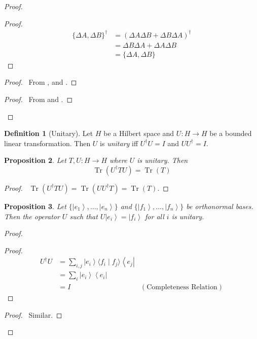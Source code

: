 \documentclass{book}
\let\qed\relax
\newtheorem{prop}{Proposition}[chapter]
\theoremstyle{definition}
\newtheorem{df}[prop]{Definition}
\newcommand{\bra}[1]{\ensuremath{\left\langle {#1} \right|}}
\newcommand{\ket}[1]{\ensuremath{\left| {#1} \right\rangle}}
\newcommand{\Tr}{\ensuremath{\operatorname{Tr}}}
\begin{document}
\begin{proof}
\begin{proof}
	\pf
	\begin{align*}
		\{ \Delta A, \Delta B \}^\dagger
		& = (\Delta A \Delta B + \Delta B \Delta A)^\dagger \\
		& = \Delta B \Delta A + \Delta A \Delta B \\
		& = \{ \Delta A, \Delta B \}
	\end{align*}
\end{proof}
\begin{proof}
	\pf\ From ,  and .
\end{proof}
\begin{proof}
	\pf\ From  and .
\end{proof}
\qed
\end{proof}

\begin{df}[Unitary]
Let $H$ be a Hilbert space and $U : H \rightarrow H$ be a bounded linear transformation. Then $U$ is \emph{unitary} iff $U^\dagger U = I$ and $U U^\dagger = I$.
\end{df}

\begin{prop}
Let $T,U : H \rightarrow H$ where $U$ is unitary. Then
\[ \Tr(U^\dagger T U) = \Tr(T) \]
\end{prop}

\begin{proof}
\pf\ $\Tr(U^\dagger T U) = \Tr(U U^\dagger T)  = \Tr(T)$. \qed
\end{proof}

\begin{prop}
Let $\{ \ket{e_1}, \ldots, \ket{e_n} \}$ and $\{ \ket{f_1}, \ldots, \ket{f_n} \}$ be orthonormal bases. Then the operator $U$ such that $U \ket{e_i} = \ket{f_i}$ for all $i$ is unitary.
\end{prop}

\begin{proof}
\pf
\step{1}{$U = \sum_i \ket{f_i} \bra{e_i}$}
\begin{proof}
	\pf
	\begin{align*}
		U^\dagger U & = \sum_{i,j} \ket{e_i} \langle f_i \mid f_j \rangle \bra{e_j} \\
		& = \sum_i \ket{e_i} \bra{e_i} \\
		& = I & (\text{Completeness Relation})
	\end{align*}
\end{proof}
\begin{proof}
	\pf\ Similar.
\end{proof}
\qed
\end{proof}
\end{document}
